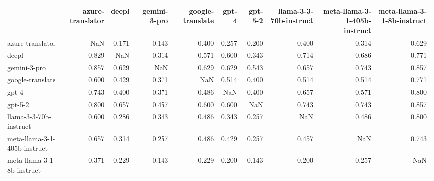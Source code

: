 \begin{tabular}{lrrrrrrrrr}
\toprule
 & azure-translator & deepl & gemini-3-pro & google-translate & gpt-4 & gpt-5-2 & llama-3-3-70b-instruct & meta-llama-3-1-405b-instruct & meta-llama-3-1-8b-instruct \\
\midrule
azure-translator & NaN & 0.171 & 0.143 & 0.400 & 0.257 & 0.200 & 0.400 & 0.314 & 0.629 \\
deepl & 0.829 & NaN & 0.314 & 0.571 & 0.600 & 0.343 & 0.714 & 0.686 & 0.771 \\
gemini-3-pro & 0.857 & 0.629 & NaN & 0.629 & 0.629 & 0.543 & 0.657 & 0.743 & 0.857 \\
google-translate & 0.600 & 0.429 & 0.371 & NaN & 0.514 & 0.400 & 0.514 & 0.514 & 0.771 \\
gpt-4 & 0.743 & 0.400 & 0.371 & 0.486 & NaN & 0.400 & 0.657 & 0.571 & 0.800 \\
gpt-5-2 & 0.800 & 0.657 & 0.457 & 0.600 & 0.600 & NaN & 0.743 & 0.743 & 0.857 \\
llama-3-3-70b-instruct & 0.600 & 0.286 & 0.343 & 0.486 & 0.343 & 0.257 & NaN & 0.486 & 0.800 \\
meta-llama-3-1-405b-instruct & 0.657 & 0.314 & 0.257 & 0.486 & 0.429 & 0.257 & 0.457 & NaN & 0.743 \\
meta-llama-3-1-8b-instruct & 0.371 & 0.229 & 0.143 & 0.229 & 0.200 & 0.143 & 0.200 & 0.257 & NaN \\
\bottomrule
\end{tabular}
